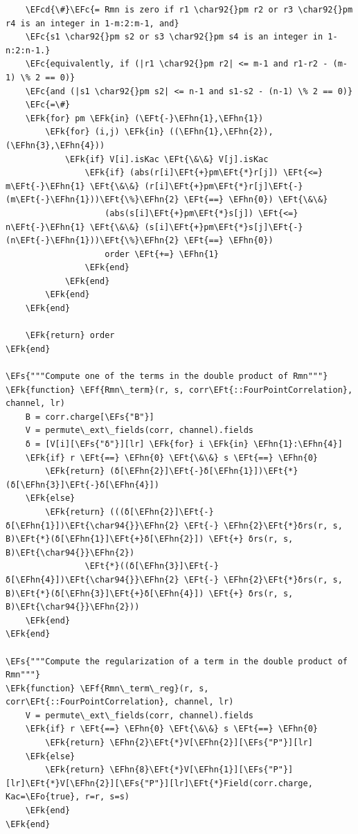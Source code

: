 \documentclass[a4paper]{article}
\numberwithin{equation}{section}
\newcommand{\EFc}[1]{\textcolor{EFc}{#1}} %
\newcommand{\EFcd}[1]{\textcolor{EFcd}{#1}} %
\newcommand{\EFs}[1]{\textcolor{EFs}{#1}} %
\newcommand{\EFk}[1]{\textcolor{EFk}{#1}} %
\newcommand{\EFf}[1]{\textcolor{EFf}{#1}} %
\newcommand{\EFt}[1]{\textcolor{EFt}{#1}} %
\newcommand{\EFo}[1]{\textcolor{EFo}{#1}} %
\newcommand{\EFhn}[1]{\textcolor{EFhn}{#1}} %
\begin{document}
\begin{itemize}
\begin{Code}
\begin{Verbatim}
    \EFcd{\#}\EFc{= Rmn is zero if r1 \char92{}pm r2 or r3 \char92{}pm r4 is an integer in 1-m:2:m-1, and}
    \EFc{s1 \char92{}pm s2 or s3 \char92{}pm s4 is an integer in 1-n:2:n-1.}
    \EFc{equivalently, if (|r1 \char92{}pm r2| <= m-1 and r1-r2 - (m-1) \% 2 == 0)}
    \EFc{and (|s1 \char92{}pm s2| <= n-1 and s1-s2 - (n-1) \% 2 == 0)}
    \EFc{=\#}
    \EFk{for} pm \EFk{in} (\EFt{-}\EFhn{1},\EFhn{1})
        \EFk{for} (i,j) \EFk{in} ((\EFhn{1},\EFhn{2}), (\EFhn{3},\EFhn{4}))
            \EFk{if} V[i].isKac \EFt{\&\&} V[j].isKac
                \EFk{if} (abs(r[i]\EFt{+}pm\EFt{*}r[j]) \EFt{<=} m\EFt{-}\EFhn{1} \EFt{\&\&} (r[i]\EFt{+}pm\EFt{*}r[j]\EFt{-}(m\EFt{-}\EFhn{1}))\EFt{\%}\EFhn{2} \EFt{==} \EFhn{0}) \EFt{\&\&}
                    (abs(s[i]\EFt{+}pm\EFt{*}s[j]) \EFt{<=} n\EFt{-}\EFhn{1} \EFt{\&\&} (s[i]\EFt{+}pm\EFt{*}s[j]\EFt{-}(n\EFt{-}\EFhn{1}))\EFt{\%}\EFhn{2} \EFt{==} \EFhn{0})
                    order \EFt{+=} \EFhn{1}
                \EFk{end}
            \EFk{end}
        \EFk{end}
    \EFk{end}

    \EFk{return} order
\EFk{end}

\EFs{"""Compute one of the terms in the double product of Rmn"""}
\EFk{function} \EFf{Rmn\_term}(r, s, corr\EFt{::FourPointCorrelation}, channel, lr)
    B = corr.charge[\EFs{"B"}]
    V = permute\_ext\_fields(corr, channel).fields
    δ = [V[i][\EFs{"δ"}][lr] \EFk{for} i \EFk{in} \EFhn{1}:\EFhn{4}]
    \EFk{if} r \EFt{==} \EFhn{0} \EFt{\&\&} s \EFt{==} \EFhn{0}
        \EFk{return} (δ[\EFhn{2}]\EFt{-}δ[\EFhn{1}])\EFt{*}(δ[\EFhn{3}]\EFt{-}δ[\EFhn{4}])
    \EFk{else}
        \EFk{return} (((δ[\EFhn{2}]\EFt{-}δ[\EFhn{1}])\EFt{\char94{}}\EFhn{2} \EFt{-} \EFhn{2}\EFt{*}δrs(r, s, B)\EFt{*}(δ[\EFhn{1}]\EFt{+}δ[\EFhn{2}]) \EFt{+} δrs(r, s, B)\EFt{\char94{}}\EFhn{2})
                \EFt{*}((δ[\EFhn{3}]\EFt{-}δ[\EFhn{4}])\EFt{\char94{}}\EFhn{2} \EFt{-} \EFhn{2}\EFt{*}δrs(r, s, B)\EFt{*}(δ[\EFhn{3}]\EFt{+}δ[\EFhn{4}]) \EFt{+} δrs(r, s, B)\EFt{\char94{}}\EFhn{2}))
    \EFk{end}
\EFk{end}

\EFs{"""Compute the regularization of a term in the double product of Rmn"""}
\EFk{function} \EFf{Rmn\_term\_reg}(r, s, corr\EFt{::FourPointCorrelation}, channel, lr)
    V = permute\_ext\_fields(corr, channel).fields
    \EFk{if} r \EFt{==} \EFhn{0} \EFt{\&\&} s \EFt{==} \EFhn{0}
        \EFk{return} \EFhn{2}\EFt{*}V[\EFhn{2}][\EFs{"P"}][lr]
    \EFk{else}
        \EFk{return} \EFhn{8}\EFt{*}V[\EFhn{1}][\EFs{"P"}][lr]\EFt{*}V[\EFhn{2}][\EFs{"P"}][lr]\EFt{*}Field(corr.charge, Kac=\EFo{true}, r=r, s=s)
    \EFk{end}
\EFk{end}


\end{Verbatim}
\end{Code}
\end{itemize}
\end{document}
